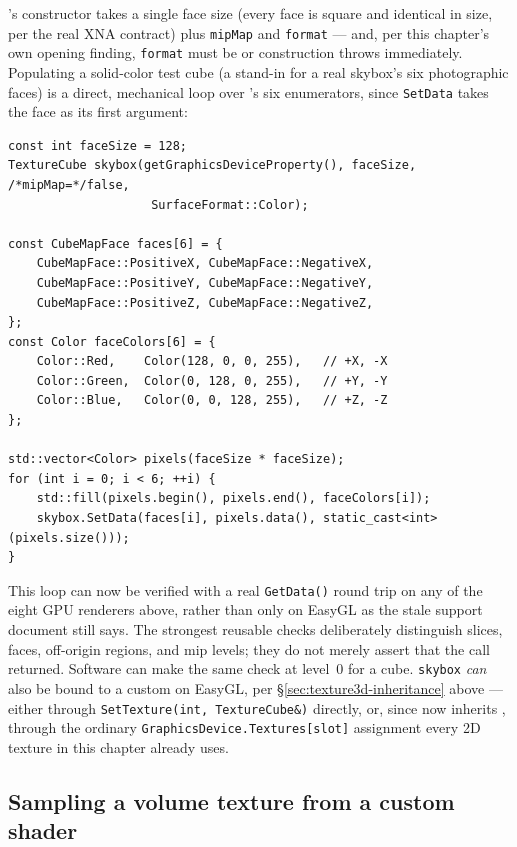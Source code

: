 's constructor takes a single face size (every face is square and
identical in size, per the real XNA contract) plus \texttt{mipMap} and \texttt{format} --- and,
per this chapter's own opening finding, \texttt{format} must be
 or construction throws immediately. Populating a solid-color
test cube (a stand-in for a real skybox's six photographic faces) is a direct, mechanical loop
over 's six enumerators, since \texttt{SetData} takes the face as its
first argument:

\begin{lstlisting}
const int faceSize = 128;
TextureCube skybox(getGraphicsDeviceProperty(), faceSize, /*mipMap=*/false,
                    SurfaceFormat::Color);

const CubeMapFace faces[6] = {
    CubeMapFace::PositiveX, CubeMapFace::NegativeX,
    CubeMapFace::PositiveY, CubeMapFace::NegativeY,
    CubeMapFace::PositiveZ, CubeMapFace::NegativeZ,
};
const Color faceColors[6] = {
    Color::Red,    Color(128, 0, 0, 255),   // +X, -X
    Color::Green,  Color(0, 128, 0, 255),   // +Y, -Y
    Color::Blue,   Color(0, 0, 128, 255),   // +Z, -Z
};

std::vector<Color> pixels(faceSize * faceSize);
for (int i = 0; i < 6; ++i) {
    std::fill(pixels.begin(), pixels.end(), faceColors[i]);
    skybox.SetData(faces[i], pixels.data(), static_cast<int>(pixels.size()));
}
\end{lstlisting}

This loop can now be verified with a real \texttt{GetData()} round trip on any of the eight
GPU renderers above, rather than only on EasyGL as the stale support document still says.
The strongest reusable checks deliberately distinguish slices, faces, off-origin regions,
and mip levels; they do not merely assert that the call returned. Software can make the same
check at level~0 for a cube. \texttt{skybox} \emph{can} also be bound to a custom
 on EasyGL, per
\S\ref{sec:texture3d-inheritance} above --- either through \texttt{SetTexture(int,
TextureCube\&)} directly, or, since  now inherits ,
through the ordinary \texttt{GraphicsDevice.Textures[slot]} assignment every 2D texture in
this chapter already uses.

\subsection{Sampling a volume texture from a custom shader}
\label{sec:texture3d-shader-example}

